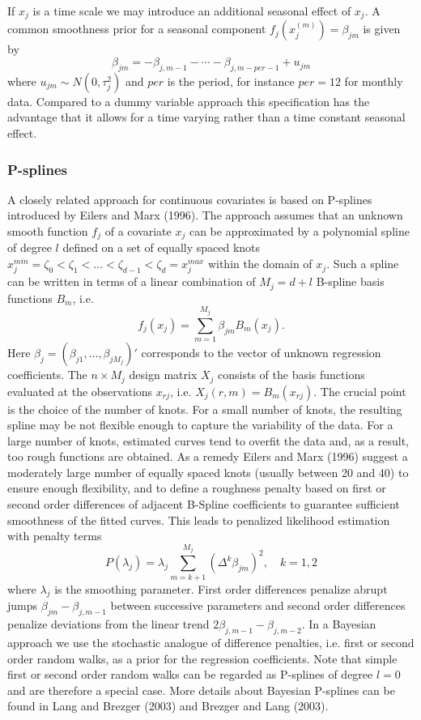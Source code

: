If $x_j$ is a time  scale we may introduce an additional seasonal
effect of $x_j$. A common smoothness prior for a seasonal
component $f_j(x_j^{(m)}) = \beta_{jm}$ is given by
\begin{equation}
\beta_{jm} = -\beta_{j,m-1} - \cdots -
\beta_{j,m-per-1}+u_{jm}\label{seasonal}
\end{equation}
where $u_{jm}\sim N(0,\tau_j^{2})$ and $per$ is the period, for
instance $per = 12$ for monthly data. Compared to a dummy variable
approach this specification has the advantage that it allows for a
time varying rather than a time constant seasonal effect.


\subsubsection{P-splines}

A closely related approach for continuous covariates is based on
P-splines introduced by Eilers and Marx (1996). The approach
assumes that an unknown smooth function $f_j$ of a covariate $x_j$
can be approximated by a polynomial spline of degree $l$ defined
on a set of equally spaced knots $x_j^{min} = \zeta_{0}  <
\zeta_{1} < \dots < \zeta_{d-1} < \zeta_{d} = x_j^{max}$ within
the domain of $x_j$. Such a spline can be written in terms of a
linear combination of $M_j = d+l$ B-spline basis functions
$B_{m}$, i.e.
$$
f_j(x_j) = \sum_{m=1}^{M_j} \beta_{jm} B_{m}(x_j).
$$
Here $\beta_j = (\beta_{j1},\dots,\beta_{jM_j})'$ corresponds to
the vector of unknown regression coefficients. The $n \times M_j$
design matrix $X_j$ consists of the basis functions evaluated at
the observations $x_{rj}$, i.e. $X_j(r,m) = B_m(x_{rj})$. The
crucial point is the choice of the number of knots. For a small
number of knots, the resulting spline may be not flexible enough
to capture the variability of the data. For a large number of
knots, estimated curves tend to overfit the data and, as a result,
too rough functions are obtained. As a remedy Eilers and Marx
(1996) suggest a moderately large number of equally spaced knots
(usually between 20 and 40) to ensure enough flexibility, and to
define a roughness penalty based on first or second order
differences of adjacent B-Spline coefficients to guarantee
sufficient smoothness of the fitted curves. This leads to
penalized likelihood estimation with penalty terms
\begin{equation}
\label{diffpenalty} P(\lambda_j) = \lambda_j \sum_{m=k+1}^{M_j}
(\Delta^k \beta_{jm})^2 , \quad k=1,2
\end{equation}
where $\lambda_j$ is the smoothing parameter. First order
differences penalize abrupt jumps $\beta_{jm}-\beta_{j,m-1}$
between successive parameters and second order differences
penalize deviations from the linear trend $2
\beta_{j,m-1}-\beta_{j,m-2}$. In a Bayesian approach we use the
stochastic analogue of difference penalties, i.e. first or second
order random walks, as a prior for the regression coefficients.
Note that simple first or second order random walks can be
regarded as P-splines of degree $l=0$ and are therefore a special
case. More details about Bayesian P-splines can be found in Lang
and Brezger (2003) and Brezger and Lang (2003).



